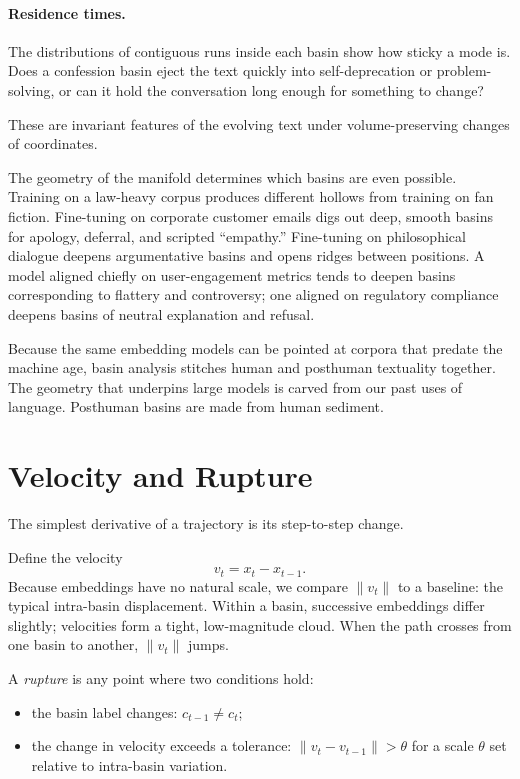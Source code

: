 \documentclass[12pt,a4paper]{article}
\begin{document}
\paragraph{Residence times.} The distributions of contiguous runs inside each basin show how sticky a mode is. Does a confession basin eject the text quickly into self-deprecation or problem-solving, or can it hold the conversation long enough for something to change?

These are invariant features of the evolving text under volume-preserving changes of coordinates.

The geometry of the manifold determines which basins are even possible. Training on a law-heavy corpus produces different hollows from training on fan fiction. Fine-tuning on corporate customer emails digs out deep, smooth basins for apology, deferral, and scripted ``empathy.'' Fine-tuning on philosophical dialogue deepens argumentative basins and opens ridges between positions. A model aligned chiefly on user-engagement metrics tends to deepen basins corresponding to flattery and controversy; one aligned on regulatory compliance deepens basins of neutral explanation and refusal.

Because the same embedding models can be pointed at corpora that predate the machine age, basin analysis stitches human and posthuman textuality together. The geometry that underpins large models is carved from our past uses of language. Posthuman basins are made from human sediment.

\section{Velocity and Rupture}

The simplest derivative of a trajectory is its step-to-step change.

Define the velocity
\[
v_t = x_t - x_{t-1}.
\]
Because embeddings have no natural scale, we compare $\|v_t\|$ to a baseline: the typical intra-basin displacement. Within a basin, successive embeddings differ slightly; velocities form a tight, low-magnitude cloud. When the path crosses from one basin to another, $\|v_t\|$ jumps.

A \emph{rupture} is any point where two conditions hold:

\begin{itemize}
  \item the basin label changes: $c_{t-1} \neq c_t$;
  \item the change in velocity exceeds a tolerance: $\|v_t - v_{t-1}\| > \theta$ for a scale $\theta$ set relative to intra-basin variation.
\end{itemize}
\end{document}
